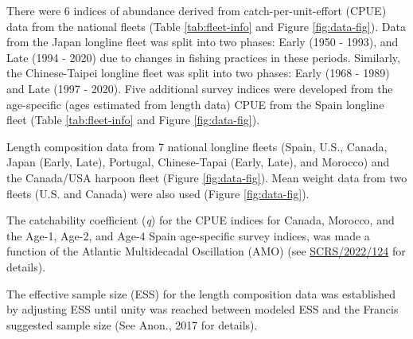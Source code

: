 \documentclass[
]{article}
\begin{document}
There were 6 indices of abundance derived from catch-per-unit-effort (CPUE) data from the national fleets (Table \ref{tab:fleet-info} and Figure \ref{fig:data-fig}). Data from the Japan longline fleet was split into two phases: Early (1950 - 1993), and Late (1994 - 2020) due to changes in fishing practices in these periods. Similarly, the Chinese-Taipei longline fleet was split into two phases: Early (1968 - 1989) and Late (1997 - 2020). Five additional survey indices were developed from the age-specific (ages estimated from length data) CPUE from the Spain longline fleet (Table \ref{tab:fleet-info} and Figure \ref{fig:data-fig}).

Length composition data from 7 national longline fleets (Spain, U.S., Canada, Japan (Early, Late), Portugal, Chinese-Tapai (Early, Late), and Morocco) and the Canada/USA harpoon fleet (Figure \ref{fig:data-fig}). Mean weight data from two fleets (U.S. and Canada) were also used (Figure \ref{fig:data-fig}).

The catchability coefficient (\emph{q}) for the CPUE indices for Canada, Morocco, and the Age-1, Age-2, and Age-4 Spain age-specific survey indices, was made a function of the Atlantic Multidecadal Oscillation (AMO) (see \href{../SCRS_Papers/Schirripa_SCRS_2022_124.pdf}{SCRS/2022/124} for details).

The effective sample size (ESS) for the length composition data was established by adjusting ESS until unity was reached between modeled ESS and the Francis suggested sample size (See Anon., 2017 for details).
\end{document}
